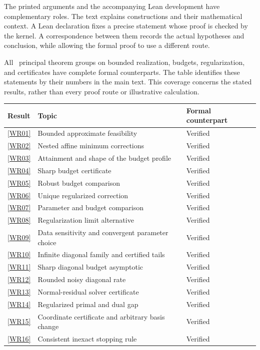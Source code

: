 \clearpage
{}\label{app:written}
The printed arguments and the accompanying Lean development have complementary roles. The text explains constructions and their mathematical context. A Lean declaration fixes a precise statement whose proof is checked by the kernel. A correspondence between them records the actual hypotheses and conclusion, while allowing the formal proof to use a different route.

All \EditionPrincipalGroups\ principal theorem groups on bounded realization, budgets, regularization, and certificates have complete formal counterparts. The table identifies these statements by their numbers in the main text. This coverage concerns the stated results, rather than every proof route or illustrative calculation.

\begin{longtable}{@{}p{.11\linewidth}p{.60\linewidth}p{.22\linewidth}@{}}
\toprule Result & Topic & Formal counterpart\\\midrule\endhead
\ref{WR01} & Bounded approximate feasibility & Verified\\[4pt]
\ref{WR02} & Nested affine minimum corrections & Verified\\[4pt]
\ref{WR03} & Attainment and shape of the budget profile & Verified\\[4pt]
\ref{WR04} & Sharp budget certificate & Verified\\[4pt]
\ref{WR05} & Robust budget comparison & Verified\\[4pt]
\ref{WR06} & Unique regularized correction & Verified\\[4pt]
\ref{WR07} & Parameter and budget comparison & Verified\\[4pt]
\ref{WR08} & Regularization limit alternative & Verified\\[4pt]
\ref{WR09} & Data sensitivity and convergent parameter choice & Verified\\[4pt]
\ref{WR10} & Infinite diagonal family and certified tails & Verified\\[4pt]
\ref{WR11} & Sharp diagonal budget asymptotic & Verified\\[4pt]
\ref{WR12} & Rounded noisy diagonal rate & Verified\\[4pt]
\ref{WR13} & Normal-residual solver certificate & Verified\\[4pt]
\ref{WR14} & Regularized primal and dual gap & Verified\\[4pt]
\ref{WR15} & Coordinate certificate and arbitrary basis change & Verified\\[4pt]
\ref{WR16} & Consistent inexact stopping rule & Verified\\
\bottomrule\end{longtable}


